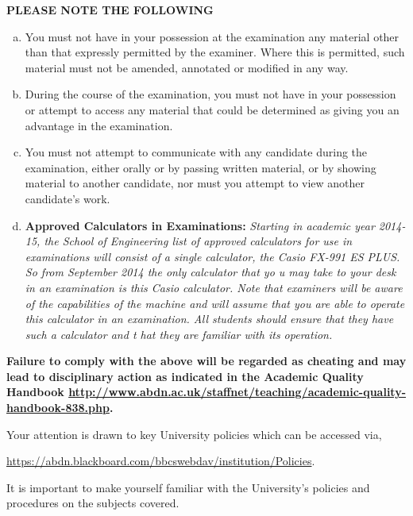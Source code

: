 \documentclass[12pts,a4paper,amsmath,amssymb,floatfix]{article}%
\begin{document}
\medskip

{\large {\bf PLEASE NOTE THE FOLLOWING}}
\begin{enumerate}[(a)]
\item You must not have in your possession at the examination any material other than that expressly permitted by the examiner. Where this is permitted, such material must not be amended, annotated or modified in any way.
\item During the course of the examination, you must not have in your possession or attempt to access any material that could be determined as  giving you an advantage in the examination.
\item You must not attempt to communicate with any candidate during the examination, either orally or by passing written material, or by showing material to another candidate, nor must you attempt to view another candidate's work.
\item {\bf Approved Calculators in Examinations:}  {\it Starting in academic year 2014-15, the School of Engineering list of approved calculators for use in examinations will consist of a single calculator, the Casio FX-991 ES PLUS.  So from September 2014 the only calculator that yo
u may take to your desk in an examination is this Casio calculator.  Note that examiners will be aware of the capabilities of the machine and will assume that you are able to operate this calculator in an examination.  All students should ensure that they have such a calculator and t
hat they are familiar with its operation.}
\end{enumerate}

\bigskip

{\bf Failure to comply with the above will be regarded as cheating and may lead to disciplinary action as indicated in the Academic Quality Handbook \href{http://www.abdn.ac.uk/staffnet/teaching/academic-quality-handbook-838.php}{http://www.abdn.ac.uk/staffnet/teaching/academic-quality-handbook-838.php}.

\medskip

Your attention is drawn to key University policies which can be accessed via,
\begin{center}
\href{https://abdn.blackboard.com/bbcswebdav/institution/Policies}{https://abdn.blackboard.com/bbcswebdav/institution/Policies}.
\end{center}
It is important to make yourself familiar with the University's policies and procedures on the subjects covered.}


\end{document}
